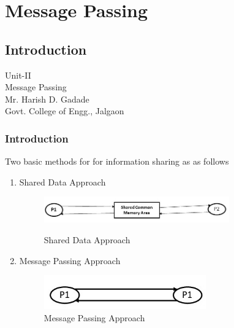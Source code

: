 \documentclass{beamer}
\author[Govt. Colleg of Engg, Jalgaon]{}
\begin{document}
\section{Message Passing}

\subsection{Introduction}
\begin{frame}
	\centering
	\large Unit-II\\
	\huge Message Passing\\
	\vspace{2cm}
	\small{Mr. Harish D. Gadade}\\
	\small{Govt. College of Engg., Jalgaon}
	
\end{frame}


\begin{frame}
	\frametitle{Introduction}
		Two basic methods for for information sharing as as follows
		\begin{enumerate}
		\item Shared Data Approach\\
		\begin{figure}
			\centering
			\includegraphics[width=8cm]{sharedDataApproach.jpg}\\
			\caption{Shared Data Approach}
		\end{figure}
		\item Message Passing Approach\\
		\begin{figure}
			\centering
			\includegraphics[width=7cm]{messagePassingApproach.jpg}
			\caption{Message Passing Approach}
		\end{figure}
		\end{enumerate}
\end{frame}
\end{document}
